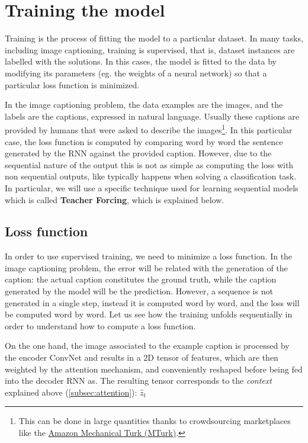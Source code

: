 \section{Training the model}\label{sec:training}

Training is the process of fitting the model to a particular dataset. In many tasks, including image captioning, training is supervised, that is, dataset instances are labelled with the solutions. In this cases, the model is fitted to the data by modifying its parameters (eg. the weights of a neural network) so that a particular loss function is minimized.

In the image captioning problem, the data examples are the images, and the labels are the captions, expressed in natural language. Usually these captions are provided by humans that were asked to describe the images\footnote{This can be done in large quantities thanks to crowdsourcing marketplaces like the \href{https://www.mturk.com/}{ Amazon Mechanical Turk (MTurk)}.}. In this particular case, the loss function is computed by comparing word by word the sentence generated by the RNN against the provided caption. However, due to the sequential nature of the output this is not as simple as computing the loss with non sequential outputs, like typically happens when solving a classification task. In particular, we will use a specific technique used for learning sequential models which is called \textbf{Teacher Forcing}, which is explained below.

\subsection{Loss function}\label{subsec:loss_function}

In order to use supervised training, we need to minimize a loss function. In the image captioning problem, the error will be related with the generation of the caption: the actual caption constitutes the ground truth, while the caption generated by the model will be the prediction. However, a sequence is not generated in a single step, instead it is computed word by word, and the loss will be computed word by word. Let us see how the training unfolds sequentially in order to understand how to compute a loss function.

On the one hand, the image associated to the example caption is processed by the encoder ConvNet and results in a 2D tensor of features, which are then weighted by the attention mechanism, and conveniently reshaped before being fed into the decoder RNN as. The resulting tensor corresponds to the \textit{context} explained above (\cref{subsec:attention}): $\hat{z}_t$

